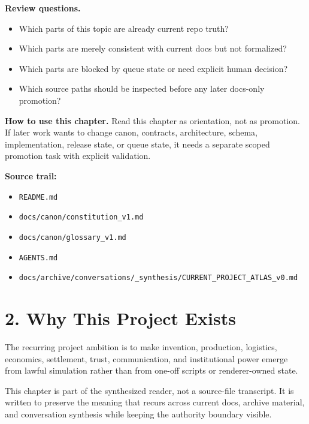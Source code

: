 \documentclass[10.5pt,a4paper,openany]{book}
\begin{document}
\textbf{Review questions.}


\begin{itemize}
\item Which parts of this topic are already current repo truth?
\item Which parts are merely consistent with current docs but not formalized?
\item Which parts are blocked by queue state or need explicit human decision?
\item Which source paths should be inspected before any later docs-\allowbreak{}only promotion?
\end{itemize}

\textbf{How to use this chapter.} Read this chapter as orientation, not as promotion.\allowbreak{} If later work wants to change canon, contracts, architecture, schema, implementation, release state, or queue state, it needs a separate scoped promotion task with explicit validation.\allowbreak{}


\textbf{Source trail:}


\begin{itemize}
\item \texttt{README.\allowbreak{}md}
\item \texttt{docs/\allowbreak{}canon/\allowbreak{}constitution\_\allowbreak{}v1.\allowbreak{}md}
\item \texttt{docs/\allowbreak{}canon/\allowbreak{}glossary\_\allowbreak{}v1.\allowbreak{}md}
\item \texttt{AGENTS.\allowbreak{}md}
\item \texttt{docs/\allowbreak{}archive/\allowbreak{}conversations/\allowbreak{}\_\allowbreak{}synthesis/\allowbreak{}CURRENT\_\allowbreak{}PROJECT\_\allowbreak{}ATLAS\_\allowbreak{}v0.\allowbreak{}md}
\end{itemize}


\section{2. Why This Project Exists}

The recurring project ambition is to make invention, production, logistics, economics, settlement, trust, communication, and institutional power emerge from lawful simulation rather than from one-\allowbreak{}off scripts or renderer-\allowbreak{}owned state.\allowbreak{}


This chapter is part of the synthesized reader, not a source-\allowbreak{}file transcript.\allowbreak{} It is written to preserve the meaning that recurs across current docs, archive material, and conversation synthesis while keeping the authority boundary visible.\allowbreak{}
\end{document}
